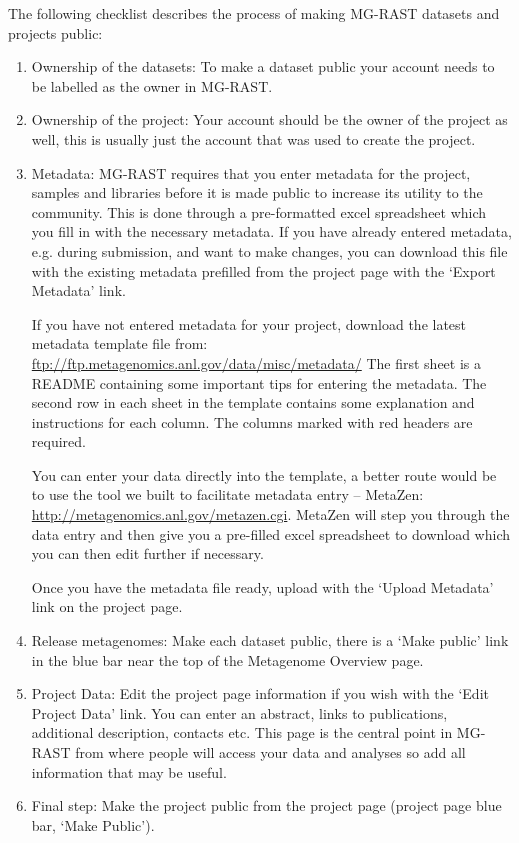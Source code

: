 \documentclass[12pt,fullpage]{report}
\begin{document}
The following checklist describes the process of making MG-RAST datasets and projects public:

\begin{enumerate}
\item 
Ownership of the datasets: To make a dataset public your account needs to be labelled as the owner in MG-RAST.
\item
Ownership of the project: Your account should be the owner of the project as well, this is usually just the account that was used to create the project.
\item
Metadata: MG-RAST requires that you enter metadata for the project, samples and libraries before it is made public to increase its utility to the community. This is done through a pre-formatted excel spreadsheet which you fill in with the necessary metadata.
If you have already entered metadata, e.g. during submission, and want to make changes, you can download this file with the existing metadata prefilled from the project page with the `Export Metadata' link.

If you have not entered metadata for your project, download the latest metadata template file from:
\url{ftp://ftp.metagenomics.anl.gov/data/misc/metadata/}
The first sheet is a README containing some important tips for entering the metadata. The second row in each sheet in the template contains some explanation and instructions for each column. The columns marked with red headers are required.

You can enter your data directly into the template, a better route would be to use the tool we built to facilitate metadata entry -- MetaZen: \url{http://metagenomics.anl.gov/metazen.cgi}.
MetaZen will step you through the data entry and then give you a pre-filled excel spreadsheet to download which you can then edit further if necessary.

Once you have the metadata file ready, upload with the `Upload Metadata' link on the project page.
\item
Release metagenomes: Make each dataset public, there is a `Make public' link in the blue bar near the top of the Metagenome Overview page.
\item
Project Data: Edit the project page information if you wish with the `Edit Project Data' link. You can enter an abstract, links to publications, additional description, contacts etc. This page is the central point in MG-RAST from where people will access your data and analyses so add all information that may be useful.
\item
Final step: Make the project public from the project page (project page blue bar, `Make Public').
\end{enumerate}
\end{document}
